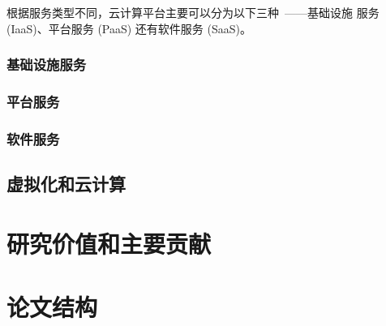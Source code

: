 根据服务类型不同，云计算平台主要可以分为以下三种~\cite{cloud-and-openstack}——基础设施
服务 (IaaS)、平台服务 (PaaS) 还有软件服务 (SaaS)。

\subsubsection{基础设施服务}

\subsubsection{平台服务}

\subsubsection{软件服务}

\subsection{虚拟化和云计算}

\section{研究价值和主要贡献}

\section{论文结构}
